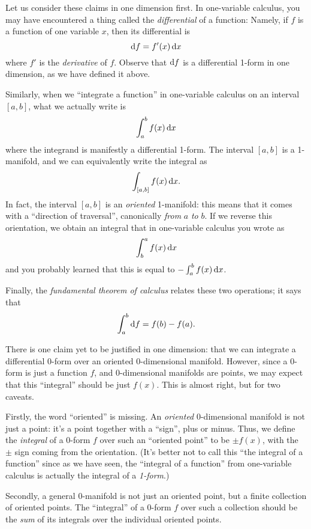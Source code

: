 \documentclass[12pt]{amsart}
\begin{document}
Let us consider these claims in one dimension first.
In one-variable calculus, you may have encountered a thing called the \emph{differential} of a function:
Namely, if $f$ is a function of one variable $x$, then its differential is
\begin{equation}
  {\ensuremath{\mathrm{d} f}} = f'(x) \, {\mathrm{d} x}\label{eq:onevariable-differential}
\end{equation}
where $f'$ is the \emph{derivative} of $f$.
Observe that ${\mathrm{d} f}$ is a differential 1-form in one dimension, as we have defined it above.

Similarly, when we ``integrate a function'' in one-variable calculus on an interval $[a,b]$, what we actually write is
\[ \int_a^b f(x) \,{\mathrm{d} x} \]
where the integrand is manifestly a differential 1-form.
The interval $[a,b]$ is a 1-manifold, and we can equivalently write the integral as 
\[ \int_{[a,b]} f(x) \,{\mathrm{d} x}. \]
In fact, the interval $[a,b]$ is an \emph{oriented} 1-manifold: this means that it comes with a ``direction of traversal'', canonically \emph{from} $a$ \emph{to} $b$.
If we reverse this orientation, we obtain an integral that in one-variable calculus you wrote as
\[ \int_b^a f(x) \,{\mathrm{d} x} \]
and you probably learned that this is equal to $-\int_a^b f(x) \,{\mathrm{d} x}$.

Finally, the \emph{fundamental theorem of calculus} relates these two operations; it says that
\begin{equation}
  \int_a^b {\mathrm{d} f} = f(b) - f(a).\label{eq:onevar-ftc}
\end{equation}

There is one claim yet to be justified in one dimension: that we can integrate a differential 0-form over an oriented $0$-dimensional manifold.
However, since a 0-form is just a function $f$, and $0$-dimensional manifolds are points, we may expect that this ``integral'' should be just $f(x)$.
This is almost right, but for two caveats.

Firstly, the word ``oriented'' is missing.
An \emph{oriented} $0$-dimensional manifold is not just a point: it's a point together with a ``sign'', plus or minus.
Thus, we define the \emph{integral} of a 0-form $f$ over such an ``oriented point'' to be $\pm f(x)$, with the $\pm$ sign coming from the orientation.
(It's better not to call this ``the integral of a function'' since as we have seen, the ``integral of a function'' from one-variable calculus is actually the integral of a \emph{1-form}.)

Secondly, a general $0$-manifold is not just an oriented point, but a finite collection of oriented points.
The ``integral'' of a 0-form $f$ over such a collection should be the \emph{sum} of its integrals over the individual oriented points.
\end{document}
